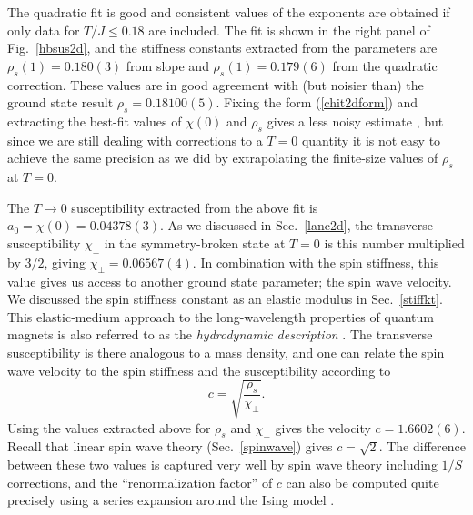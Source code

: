 \documentclass[draft,numberedheadings]{aipproc}
\begin{document}
The quadratic fit is good and consistent values of the exponents are obtained if only data for $T/J \le 0.18$ are included. The fit is shown in the 
right panel of Fig.~\ref{hbsus2d}, and the stiffness constants extracted from the parameters are $\rho_s(1)=0.180(3)$ from slope and $\rho_s(1)=0.179(6)$ 
from the quadratic correction. These values are in good agreement with (but noisier than) the ground state result $\rho_s=0.18100(5)$. Fixing the form 
(\ref{chit2dform}) and extracting the best-fit values of $\chi(0)$ and $\rho_s$ gives a less noisy estimate \cite{kim98}, but since we are still dealing 
with corrections to a $T=0$ quantity it is not easy to achieve the same precision as we did by extrapolating the finite-size values of $\rho_s$ at $T=0$.

The $T\to 0$ susceptibility extracted from the above fit is $a_0=\chi(0)=0.04378(3)$. As we discussed in Sec.~\ref{lanc2d}, the transverse susceptibility 
$\chi_\perp$ in the symmetry-broken state at $T=0$ is this number multiplied by $3/2$, giving $\chi_\perp=0.06567(4)$. In combination with the spin stiffness, 
this value gives us access to another ground state parameter; the spin wave velocity. We discussed the spin stiffness constant as an elastic modulus in 
Sec.~\ref{stiffkt}. This elastic-medium approach to the long-wavelength properties of quantum magnets is also referred to as the {\it hydrodynamic description} 
\cite{halperin69}. The transverse susceptibility is there analogous to a mass density, and one can relate the spin wave velocity to the spin 
stiffness and the susceptibility according to 
\begin{equation}
c=\sqrt{\frac{\rho_s}{\chi_\perp}}.
\end{equation}
Using the values extracted above for $\rho_s$ and $\chi_\perp$ gives the velocity $c=1.6602(6)$. Recall that linear spin wave theory 
(Sec.~\ref{spinwave}) gives $c=\sqrt{2}$. The difference between these two values is captured very well by spin wave theory including 
$1/S$ corrections, and the ``renormalization factor'' of $c$ can also be computed quite precisely using a series expansion around 
the Ising model \cite{singh89}.
\end{document}
